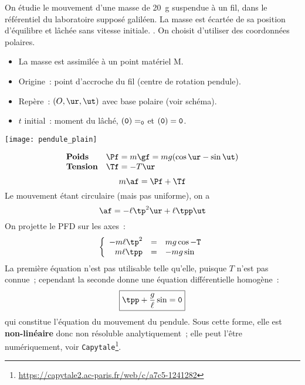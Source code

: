 \documentclass[../main/main.tex]{subfiles}
\begin{document}
\hspace*{-0.75cm}
\begin{minipage}{0.70\linewidth}
	\begin{enumerate}[label=\sqenumi]
		 On étudie le mouvement d'une masse de
		\SI{20}{g} suspendue à un fil, dans le référentiel du laboratoire
		supposé galiléen. La masse est écartée de sa position d'équilibre et
		lâchée sans vitesse initiale.
		.
		 On choisit d'utiliser des coordonnées polaires.
		\begin{itemize}
			\item La masse est assimilée à un point matériel M.
			\item Origine~: point d'accroche du fil (centre de rotation
			      pendule).
			\item Repère~: $(O,\ur,\ut)$ avec base polaire (voir schéma).
			\item $t$ initial~: moment du lâché, $\tt(0) = \tt_0$ et
			      $\tt(0) = 0$.
		\end{itemize}
	\end{enumerate}
\end{minipage}
\hfill
\begin{minipage}{0.25\linewidth}
	\begin{center}
		\texttt{[image: pendule\_plain]}
	\end{center}
\end{minipage}
\begin{enumerate}[label=\sqenumi, start=4]
	\[
		\begin{array}{ll}
			\textbf{Poids}   & \Pf = m\gf = mg(\cos\tt \ur - \sin\tt \ut) \\
			\textbf{Tension} & \Tf = -T\ur
		\end{array}
	\]
	\[m\af = \Pf + \Tf\]
	Le mouvement étant circulaire (mais pas uniforme), on a
	\[\af = -\ell\tp^2 \ur + \ell\tpp \ut\]
	 On projette le PFD sur les axes~:
	\[
		\left\{
		\begin{array}{rcl}
			-m\ell\tp^2 & = & mg\cos\tt - T \\
			m\ell\tpp   & = & -mg\sin\tt
		\end{array}
		\right.
	\]
	 La première équation n'est pas utilisable telle qu'elle,
	puisque $T$ n'est pas connue~; cependant la seconde donne une équation
	différentielle homogène~:
	\[\boxed{\tpp + \frac{g}{\ell}\sin\tt = 0}\]
	qui constitue l'équation du mouvement du pendule. Sous cette forme, elle
	est \textbf{non-linéaire} donc non résoluble analytiquement~; elle peut
	l'être numériquement, voir
	\texttt{Capytale}\footnote{\url{
			https://capytale2.ac-paris.fr/web/c/a7c5-1241282}}.
\end{enumerate}
\end{document}
